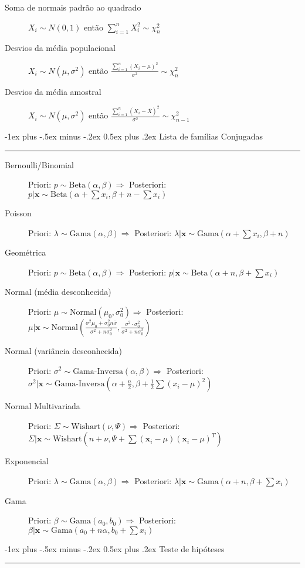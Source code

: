 \documentclass[10pt,landscape]{article}
\makeatletter
\renewcommand{\section}{\@startsection{section}{1}{0mm}%
                                {-1ex plus -.5ex minus -.2ex}%
                                {0.5ex plus .2ex}%
                                {\normalfont\small\bfseries}}
\makeatother
\begin{document}
\begin{multicols}{3}
    \begin{description}

    \item[Soma de normais padrão ao quadrado] $X_i \sim N(0,1)$ então $\sum_{i=1}^{n} X_i^2 \sim \chi_n^2$
    \item[Desvios da média populacional] $X_i \sim N(\mu, \sigma^2)$ então $\frac{\sum_{i=1}^{n}(X_i - \mu)^2}{\sigma^2} \sim \chi_n^2$
    \item[Desvios da média amostral] $X_i \sim N(\mu, \sigma^2)$ então $\frac{\sum_{i=1}^{n}(X_i - \bar{X})^2}{\sigma^2} \sim \chi_{n-1}^2$
    \end{description}

    \end{multicols}

    \section{Lista de famílias Conjugadas}\smallskip \hrule height 2pt \smallskip

        \begin{description}
            \item[Bernoulli/Binomial] Priori: $p \sim \text{Beta}(\alpha, \beta) \Rightarrow$ Posteriori: $p|\boldsymbol{x} \sim \text{Beta}\left(\alpha + \sum x_i, \beta + n - \sum x_i\right)$
            \item[Poisson] Priori: $\lambda \sim \text{Gama}(\alpha, \beta) \Rightarrow$ Posteriori: $\lambda|\boldsymbol{x} \sim \text{Gama}\left(\alpha + \sum x_i, \beta + n\right)$
            \item[Geométrica] Priori: $p \sim \text{Beta}(\alpha, \beta) \Rightarrow$ Posteriori: $p|\boldsymbol{x} \sim \text{Beta}\left(\alpha + n, \beta + \sum x_i\right)$
            \item[Normal (média desconhecida)] Priori: $\mu \sim \text{Normal}(\mu_0, \sigma_0^2) \Rightarrow$ Posteriori: $\mu|\boldsymbol{x} \sim \text{Normal}\left(\frac{\sigma^2 \mu_0 + \sigma_0^2 n \bar{x}}{\sigma^2 + n\sigma_0^2}, \frac{\sigma^2 \cdot \sigma_0^2}{\sigma^2 + n\sigma_0^2}\right)$
            \item[Normal (variância desconhecida)] Priori: $\sigma^2 \sim \text{Gama-Inversa}(\alpha, \beta) \Rightarrow$ Posteriori: $\sigma^2|\boldsymbol{x} \sim \text{Gama-Inversa}\left(\alpha + \frac{n}{2}, \beta + \frac{1}{2}\sum(x_i - \mu)^2\right)$
            \item[Normal Multivariada] Priori: $\Sigma \sim \text{Wishart}(\nu, \Psi) \Rightarrow$ Posteriori: $\Sigma|\boldsymbol{x} \sim \text{Wishart}\left(n + \nu, \Psi + \sum(\mathbf{x}_i - \mu)(\mathbf{x}_i - \mu)^T\right)$
            \item[Exponencial] Priori: $\lambda \sim \text{Gama}(\alpha, \beta) \Rightarrow$ Posteriori: $\lambda|\boldsymbol{x} \sim \text{Gama}\left(\alpha + n, \beta + \sum x_i\right)$
            \item[Gama] Priori: $\beta \sim \text{Gama}(a_0, b_0) \Rightarrow$ Posteriori: $\beta|\boldsymbol{x} \sim \text{Gama}\left(a_0 + n\alpha, b_0 + \sum x_i\right)$
        \end{description}


\section{Teste de hipóteses}\smallskip \hrule height 2pt \smallskip
\end{document}
